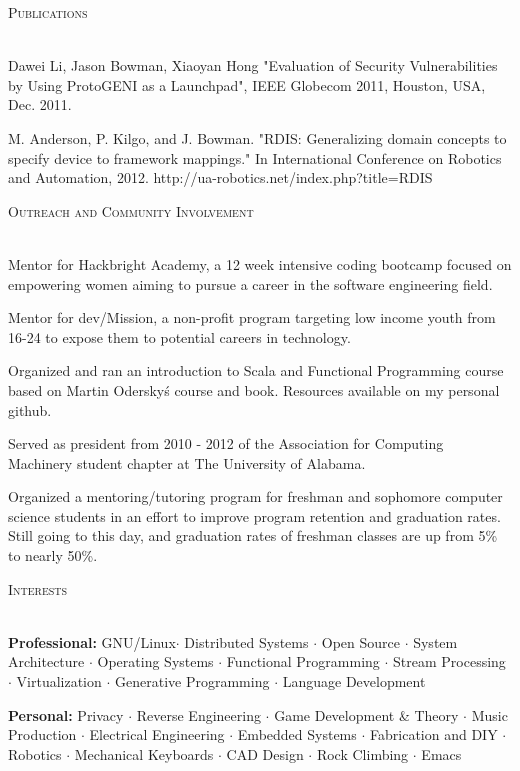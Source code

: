 \documentclass[10pt,letterpaper]{article}
\newcommand{\lineunder}{\vspace*{-8pt} \\ \hspace*{-18pt} \hrulefill \\}
\newcommand{\header}[1]{{\hspace*{-15pt}\vspace*{6pt} \textsc{#1}} \vspace*{-6pt} \lineunder}
\begin{document}
\header{Publications}
\vspace*{-5pt}
\begin{itemize*}
\item Dawei Li, Jason Bowman, Xiaoyan Hong "Evaluation of Security Vulnerabilities by Using ProtoGENI as a Launchpad", IEEE Globecom 2011, Houston, USA, Dec. 2011.
\item M. Anderson, P. Kilgo, and J. Bowman. "RDIS: Generalizing domain concepts to specify device to framework mappings." In International Conference on Robotics and Automation, 2012. http://ua-robotics.net/index.php?title=RDIS
\end{itemize*}

\vspace*{3pt}

\header{Outreach and Community Involvement}
\vspace*{-5pt}
\begin{itemize*}
\item Mentor for Hackbright Academy, a 12 week intensive coding bootcamp focused
  on empowering women aiming to pursue a career in the software engineering field.
\item Mentor for dev/Mission, a non-profit program targeting low income youth
  from 16-24 to expose them to potential careers in technology.
\item Organized and ran an introduction to Scala and Functional Programming
  course based on Martin Odersky\'s course and book. Resources available on
  my personal github. 
\item Served as president from 2010 - 2012 of the Association for Computing
  Machinery student chapter at The University of Alabama.
\item Organized a mentoring/tutoring program for freshman and sophomore computer
  science students in an effort to improve program retention and graduation
  rates. Still going to this day, and graduation rates of freshman classes are
  up from 5\% to nearly 50\%.
\end{itemize*}

\vspace*{3pt}

\header{Interests}
\vspace*{-5pt}
\begin{itemize*}
\item \textbf{Professional:} GNU/Linux$\cdot$ Distributed Systems $\cdot$ Open Source $\cdot$
  System Architecture $\cdot$ Operating Systems $\cdot$ Functional Programming
  $\cdot$ Stream Processing $\cdot$ Virtualization $\cdot$
  Generative Programming $\cdot$ Language Development
\item \textbf{Personal:} Privacy $\cdot$ Reverse Engineering $\cdot$ Game
  Development \& Theory $\cdot$ Music Production $\cdot$ Electrical Engineering
  $\cdot$ Embedded Systems $\cdot$ Fabrication and DIY $\cdot$ Robotics $\cdot$ Mechanical
  Keyboards $\cdot$ CAD Design $\cdot$ Rock Climbing $\cdot$ Emacs 
\end{itemize*}
\vspace*{8pt}

	
\end{document}
